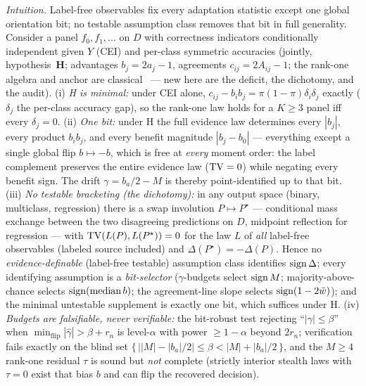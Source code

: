 \begin{theorem}\label{thm:conj1-dichotomy}\label{thm:H-deficit}\label{sec:conj1-closure}
\emph{Intuition.} Label-free observables fix every adaptation statistic except one global
orientation bit; no testable assumption class removes that bit in full generality.
Consider a panel $f_0,f_1,\dots$ on $D$ with correctness indicators conditionally
independent given $Y$ (CEI) and per-class symmetric accuracies (jointly,
hypothesis~\textbf{H}; advantages $b_j=2a_j-1$, agreements $c_{ij}=2A_{ij}-1$; the
rank-one algebra and anchor are classical~\cite{parisi2014,jaffe2015,platanios2014,ibrahim2019} ---
new here are the deficit, the dichotomy, and the audit).
\textnormal{(i) \emph{H is minimal:}} under CEI alone,
$c_{ij}-b_ib_j=\pi(1-\pi)\delta_i\delta_j$ exactly ($\delta_j$ the per-class accuracy
gap), so the rank-one law holds for a $K\ge3$ panel iff every $\delta_j=0$.
\textnormal{(ii) \emph{One bit:}} under H the full evidence law determines every
$|b_j|$, every product $b_ib_j$, and every benefit magnitude $|b_j-b_0|$ --- everything
except a single global flip $b\mapsto-b$, which is free at \emph{every} moment order:
the label complement preserves the entire evidence law ($\mathrm{TV}=0$) while negating every
benefit sign. The drift $\gamma=b_a/2-M$ is thereby point-identified up to that bit.
\textnormal{(iii) \emph{No testable bracketing (the dichotomy):}} in any output space
(binary, multiclass, regression) there is a swap involution $P\mapsto P^\star$ ---
conditional mass exchange between the two disagreeing predictions on $D$, midpoint
reflection for regression --- with $\mathrm{TV}(L(P),L(P^\star))=0$ for the law $L$ of
\emph{all} label-free observables (labeled source included) and
$\Delta(P^\star)=-\Delta(P)$. Hence no \emph{evidence-definable} (label-free testable)
assumption class identifies $\operatorname{sign}\Delta$; every identifying assumption is a
\emph{bit-selector} ($\gamma$-budgets select $\operatorname{sign} M$; majority-above-chance selects
$\operatorname{sign}(\mathrm{median}\,b)$; the agreement-line slope selects $\operatorname{sign}(1-2\bar w)$); and
the minimal untestable supplement is exactly one bit, which suffices under H.
\textnormal{(iv) \emph{Budgets are falsifiable, never verifiable:}} the bit-robust test
rejecting ``$|\gamma|\le\beta$'' when $\min_{\mathrm{flip}}|\hat\gamma|>\beta+r_n$ is
level-$\alpha$ with power $\ge1-\alpha$ beyond $2r_n$; verification fails exactly on
the blind set $\big\{\,\big||M|-|b_a|/2\big|\le\beta<|M|+|b_a|/2\,\big\}$, and the
$M\ge4$ rank-one residual $\tau$ is sound but \emph{not} complete (strictly interior
stealth laws with $\tau=0$ exist that bias $b$ and can flip the recovered decision).
\end{theorem}
